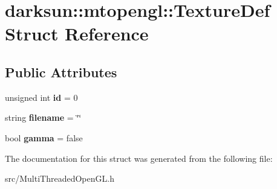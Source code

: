 \hypertarget{structdarksun_1_1mtopengl_1_1_texture_def}{}\section{darksun\+::mtopengl\+::Texture\+Def Struct Reference}
\label{structdarksun_1_1mtopengl_1_1_texture_def}
\subsection*{Public Attributes}
\begin{DoxyCompactItemize}
\item 
\mbox{\label{structdarksun_1_1mtopengl_1_1_texture_def_a3743590fbad16b940c0bc68b7deb3211}} 
unsigned int {\bfseries id} = 0
\item 
\mbox{\label{structdarksun_1_1mtopengl_1_1_texture_def_a034c7182a2a2f5e7add9983cd3b6e54a}} 
string {\bfseries filename} = \char`\"{}\char`\"{}
\item 
\mbox{\label{structdarksun_1_1mtopengl_1_1_texture_def_adeee652f6f201b52cbc2d66964182123}} 
bool {\bfseries gamma} = false
\end{DoxyCompactItemize}


The documentation for this struct was generated from the following file\+:\begin{DoxyCompactItemize}
\item 
src/Multi\+Threaded\+Open\+G\+L.\+h\end{DoxyCompactItemize}
